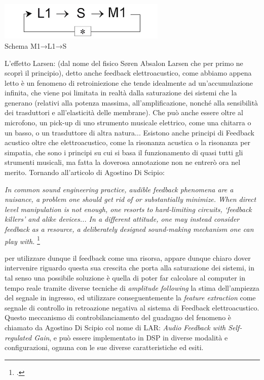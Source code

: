 \begin{center}
\vspace{0.5cm}
\includegraphics[width=8cm]{figures/larsen_feedback_scheme.png} \\
{Schema M1→L1→S} \\ 
\vspace{0.5cm}
\end{center}

L'effetto Larsen: (dal nome del fisico Søren Absalon Larsen
che per primo ne scoprì il principio), detto anche feedback elettroacustico,
come abbiamo appena letto è un fenomeno di retroiniezione che tende idealmente 
ad un'accumulazione infinita, che viene poi limitata in realtà dalla saturazione dei sistemi 
che la generano (relativi alla potenza massima, all'amplificazione, nonché alla sensibilità dei
trasduttori e all'elasticità delle membrane). Che può anche essere oltre al microfono, un
pick-up di uno strumento musicale elettrico, come una chitarra o un basso, o un trasduttore di
altra natura... 
Esistono anche principi di Feedback acustico oltre che elettroacustico, 
come la risonanza acustica o la risonanza per simpatia,
che sono i principi su cui si basa il funzionamento di quasi tutti gli strumenti musicali,
ma fatta la doverosa annotazione non ne entrerò ora nel merito.
Tornando all'articolo di Agostino Di Scipio:

\begin{center}
\vspace{0.5cm}
\textit{In common sound engineering practice, audible feedback phenomena are a nuisance, a problem one
should get rid of or substantially minimize. When direct level manipulation is not enough, one
resorts to hard-limiting circuits, ‘feedback killers’ and alike devices... 
In a different attitude, one may instead consider feedback as
a resource, a deliberately designed sound-making mechanism one can play with.} \footcite{di_scipio_relational_2022}
\vspace{0.5cm}
\vspace{0.5cm}
\end{center}

per utilizzare dunque il feedback come una
risorsa, appare dunque chiaro dover intervenire riguardo questa sua crescita che porta alla saturazione dei sistemi, in tal senso una possibile soluzione è quella di poter far calcolare
al computer in tempo reale tramite diverse tecniche di \textit{amplitude following} la stima dell'ampiezza
del segnale in ingresso, ed utilizzare conseguentemente la \textit{feature extraction} come segnale di controllo in retroazione negativa al sistema di Feedback elettroacustico.
Questo meccanismo di controbilanciamento del guadagno
del fenomeno è chiamato da Agostino Di Scipio col nome di LAR: \textit{Audio Feedback with Self-regulated Gain},
e può essere implementato in DSP in diverse modalità e configurazioni,
ognuna con le sue diverse caratteristiche ed esiti. \\

